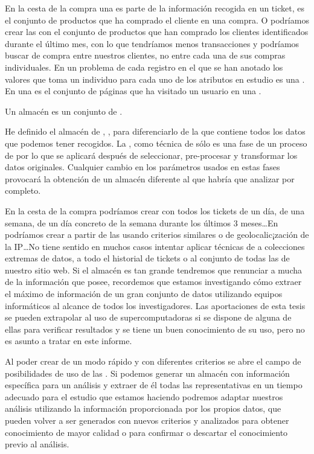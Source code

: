 En la cesta de la compra una \transaccion es parte de la información recogida en un ticket, es el conjunto de productos que ha comprado el cliente en una compra. O podríamos crear las \transacciones con el conjunto de productos que han comprado los clientes identificados durante el último mes, con lo que tendríamos menos transacciones y podríamos buscar \patrones de compra entre nuestros clientes, no entre cada una de sus compras individuales. En un problema de \clasificacion cada registro en el que se han anotado los valores que toma un individuo para cada uno de los atributos en estudio es una \transaccion. En \WUM una \transaccion es el conjunto de páginas que ha visitado un usuario en una \sn.

\begin{Definition}[Almacén \D]
   Un almacén \D es un conjunto de \transacciones.
\label{def:1:3:2:D}
\end{Definition}

He definido el almacén de \transacciones, \D, para diferenciarlo de la \DB que contiene todos los datos que podemos tener recogidos. La \arm, como técnica de \dm sólo es una fase de un proceso de \KDD por lo que se aplicará después de seleccionar, pre-procesar y transformar los datos originales. Cualquier cambio en los parámetros usados en estas fases provocará la obtención de un almacén \D diferente al que habría que analizar por completo.

En la cesta de la compra podríamos crear \D con todos los tickets de un día, de una semana, de un día concreto de la semana durante los últimos 3 meses\ldots En \WUM podríamos crear \D a partir de las \sns usando criterios similares o de geolocalic¡zación de la IP\ldots No tiene sentido en muchos casos intentar aplicar técnicas de \dm a colecciones extremas de datos, a todo el historial de tickets o al conjunto de todas las \sns de nuestro sitio web. Si el almacén \D es tan grande tendremos que renunciar a mucha de la información que posee, recordemos que estamos investigando cómo extraer el máximo de información de un gran conjunto de datos utilizando equipos informáticos al alcance de todos los investigadores. Las aportaciones de esta tesis se pueden extrapolar al uso de supercomputadoras si se dispone de alguna de ellas para verificar resultados y se tiene un buen conocimiento de su uso, pero no es asunto a tratar en este informe.

Al poder crear \D de un modo rápido y con diferentes criterios se abre el campo de posibilidades de uso de las \ars. Si podemos generar un almacén \D con información específica para un análisis y extraer de él todas las \ars representativas en un tiempo adecuado para el estudio que estamos haciendo podremos adaptar nuestros análisis utilizando la información proporcionada por los propios datos, que pueden volver a ser generados con nuevos criterios y analizados para obtener conocimiento de mayor calidad o para confirmar o descartar el conocimiento previo al análisis.

